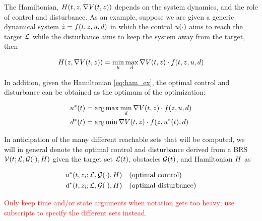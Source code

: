 The Hamiltonian, $H(t, z, \nabla V(t,z))$ depends on the system dynamics, and the role of control and disturbance. As an example, suppose we are given a generic dynamical system $\dot {z} = f(t, z, u, d)$ in which the control $u(\cdot)$ aims to reach the target $\mathcal{L}$ while the disturbance aims to keep the system away from the target, then

\begin{equation}
\label{eq:ham_ex}
\begin{aligned}
\ham(\state, \nabla \valfunc(t,\state)) = \min_\ctrl \max_\dstb \nabla \valfunc(t,\state) \cdot \fdyn(t, \state, \ctrl, \dstb)
\end{aligned}
\end{equation}

In addition, given the Hamiltonian \eqref{eq:ham_ex}, the optimal control and disturbance can be obtained as the optimum of the optimization:

\begin{equation}
\label{eq:opt_ctrl_dstb_ex}
\begin{aligned}
\ctrl^*(t) &= \arg \max \min_\dstb \nabla \valfunc(t,\state) \cdot \fdyn(\state, \ctrl, \dstb)\\
\dstb^*(t) &= \arg \min \nabla \valfunc(t,\state) \cdot \fdyn(\state, \ctrl^*(t), \dstb)
\end{aligned}
\end{equation}

In anticipation of the many different reachable sets that will be computed, we will in general denote the optimal control and disturbance derived from a BRS $\mathcal{V}(t; \mathcal{L}, \mathcal{G}(\cdot), H)$ given the target set $\mathcal{L}(t)$, obstacles $\mathcal{G}(t)$, and Hamiltonian $H$ as 

\begin{equation}
\label{eq:opt_ctrl}
\begin{aligned}
\ctrl^*(t, \state_i; \targetset, \obsset(\cdot), \ham) &\quad \text{(optimal control)} \\
\dstb^*(t, \state_i; \targetset, \obsset(\cdot), \ham) &\quad \text{(optimal disturbance)}
\end{aligned}
\end{equation}

\textcolor{red}{Only keep time and/or state arguments when notation gets too heavy; use subscripts to specify the different sets instead.}
